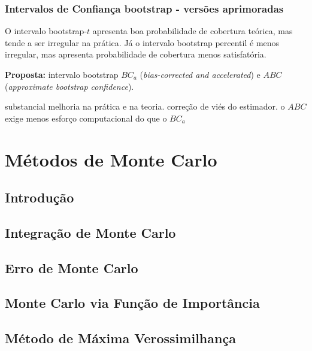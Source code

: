 \documentclass[
  letterpaper,
  DIV=11,
  numbers=noendperiod]{scrreprt}
\begin{document}
\subsection{Intervalos de Confiança bootstrap - versões
aprimoradas}\label{intervalos-de-confianuxe7a-bootstrap---versuxf5es-aprimoradas}

O intervalo bootstrap-\(t\) apresenta boa probabilidade de cobertura
teórica, mas tende a ser irregular na prática. Já o intervalo bootstrap
percentil é menos irregular, mas apresenta probabilidade de cobertura
menos satisfatória.

\textbf{Proposta:} intervalo bootstrap \(BC_a\) (\emph{bias-corrected
and accelerated}) e \(ABC\) (\emph{approximate bootstrap confidence}).

substancial melhoria na prática e na teoria. correção de viés do
estimador. o \(ABC\) exige menos esforço computacional do que o \(BC_a\)


\chapter{Métodos de Monte Carlo}\label{muxe9todos-de-monte-carlo}

\section{Introdução}\label{introduuxe7uxe3o-4}

\section{Integração de Monte
Carlo}\label{integrauxe7uxe3o-de-monte-carlo}

\section{Erro de Monte Carlo}\label{erro-de-monte-carlo}

\section{Monte Carlo via Função de
Importância}\label{monte-carlo-via-funuxe7uxe3o-de-importuxe2ncia}

\section{Método de Máxima
Verossimilhança}\label{muxe9todo-de-muxe1xima-verossimilhanuxe7a}
\end{document}
